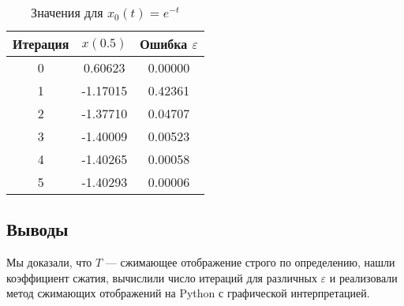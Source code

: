 \documentclass{article}
\begin{document}
\begin{table}[H]
    \centering
    \small
    \setlength{\tabcolsep}{10pt}
    \renewcommand{\arraystretch}{1.2}
    \caption{Значения для $x_0(t) = e^{-t}$}
    \begin{tabular}{c c c}
        \toprule
        Итерация & $x(0.5)$ & Ошибка $\varepsilon$ \\
        \midrule
        0 & 0.60623 & 0.00000 \\
        1 & -1.17015 & 0.42361 \\
        2 & -1.37710 & 0.04707 \\
        3 & -1.40009 & 0.00523 \\
        4 & -1.40265 & 0.00058 \\
        5 & -1.40293 & 0.00006 \\
        \bottomrule
    \end{tabular}
\end{table}

\newpage
\subsection{Выводы}

Мы доказали, что \( T \) — сжимающее отображение строго по определению, нашли коэффициент сжатия, вычислили число итераций для различных \( \varepsilon \) и реализовали метод сжимающих отображений на Python с графической интерпретацией.
\end{document}

